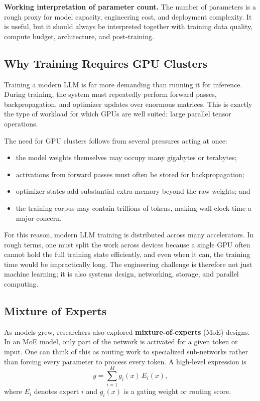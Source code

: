 \documentclass[12pt]{article}
\begin{document}
\begin{def-box}
\textbf{Working interpretation of parameter count.} The number of parameters is a rough proxy for model capacity, engineering cost, and deployment complexity. It is useful, but it should always be interpreted together with training data quality, compute budget, architecture, and post-training.
\end{def-box}

\subsection{Why Training Requires GPU Clusters}

Training a modern LLM is far more demanding than running it for inference. During training, the system must repeatedly perform forward passes, backpropagation, and optimizer updates over enormous matrices. This is exactly the type of workload for which GPUs are well suited: large parallel tensor operations.

The need for GPU clusters follows from several pressures acting at once:
\begin{itemize}
    \item the model weights themselves may occupy many gigabytes or terabytes;
    \item activations from forward passes must often be stored for backpropagation;
    \item optimizer states add substantial extra memory beyond the raw weights; and
    \item the training corpus may contain trillions of tokens, making wall-clock time a major concern.
\end{itemize}

For this reason, modern LLM training is distributed across many accelerators. In rough terms, one must split the work across devices because a single GPU often cannot hold the full training state efficiently, and even when it can, the training time would be impractically long. The engineering challenge is therefore not just machine learning; it is also systems design, networking, storage, and parallel computing.

\subsection{Mixture of Experts}

As models grew, researchers also explored \textbf{mixture-of-experts} (MoE) designs. In an MoE model, only part of the network is activated for a given token or input. One can think of this as routing work to specialized sub-networks rather than forcing every parameter to process every token. A high-level expression is
\begin{equation}
    y = \sum_{i=1}^M g_i(x)\,E_i(x),
    \label{t15eq:moe}
\end{equation}
where $E_i$ denotes expert $i$ and $g_i(x)$ is a gating weight or routing score.
\end{document}
